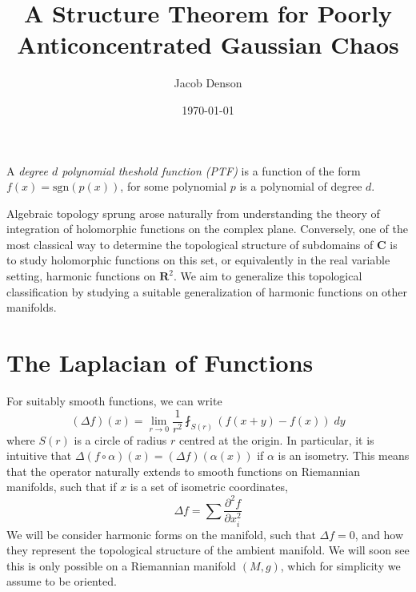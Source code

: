 \documentclass{article}
\title{A Structure Theorem for Poorly Anticoncentrated Gaussian Chaos}
\author{Jacob Denson}
\date{\today}
\theoremstyle{plain}
\theoremstyle{remark}
\theoremstyle{definition}
\begin{document}
\maketitle

A \emph{degree $d$ polynomial theshold function (PTF)} is a function of the form $f(x) = \text{sgn}(p(x))$, for some polynomial $p$ is a polynomial of degree $d$.

Algebraic topology sprung arose naturally from understanding the theory of integration of holomorphic functions on the complex plane. Conversely, one of the most classical way to determine the topological structure of subdomains of $\mathbf{C}$ is to study holomorphic functions on this set, or equivalently in the real variable setting, harmonic functions on $\mathbf{R}^2$. We aim to generalize this topological classification by studying a suitable generalization of harmonic functions on other manifolds.

\section{The Laplacian of Functions}

For suitably smooth functions, we can write
%
\[ (\Delta f)(x) = \lim_{r \to 0} \frac{1}{r^2} \fint_{S(r)} \left( f(x + y) - f(x) \right)\; dy \]
%
where $S(r)$ is a circle of radius $r$ centred at the origin. In particular, it is intuitive that $\Delta (f \circ \alpha)(x) = (\Delta f)(\alpha(x))$ if $\alpha$ is an isometry. This means that the operator naturally extends to smooth functions on Riemannian manifolds, such that if $x$ is a set of isometric coordinates,
%
\[ \Delta f = \sum \frac{\partial^2 f}{\partial x_i^2} \]
%
We will be consider harmonic forms on the manifold, such that $\Delta f = 0$, and how they represent the topological structure of the ambient manifold. We will soon see this is only possible on a Riemannian manifold $(M,g)$, which for simplicity we assume to be oriented.
\end{document}
